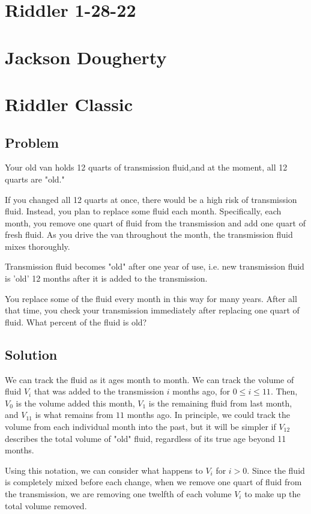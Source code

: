 \documentclass[reqno]{amsart}
\begin{document}
\section*{Riddler 1-28-22}
\section*{Jackson Dougherty}

\section{Riddler Classic}

\subsection*{Problem}

Your old van holds 12 quarts of transmission fluid,and at the moment, all 12 quarts are "old." 

If you changed all 12 quarts at once, there would be a high risk of transmission fluid. Instead, you plan to replace some fluid each month. Specifically, each month, you remove one quart of fluid from the transmission and add one quart of fresh fluid. As you drive the van throughout the month, the transmission fluid mixes thoroughly. 

Transmission fluid becomes "old" after one year of use, i.e. new transmission  fluid is 'old' 12 months after it is added to the transmission. 

You replace some of the fluid every month in this way for many years. After all that time, you check your transmission immediately after replacing one quart of fluid. What percent of the fluid is old?

\subsection*{Solution}

We can track the fluid as it ages month to month. We can track the volume of fluid $V_i$ that was added to the transmission $i$ months ago, for $0\leq i\leq 11$. Then, $V_0$ is the volume added this month, $V_1$ is the remaining fluid from last month, and $V_{11}$ is what remains from $11$ months ago. In principle, we could track the volume from each individual month into the past, but it will be simpler if $V_{12}$ describes the total volume of "old" fluid, regardless of its true age beyond 11 months. 

Using this notation, we can consider what happens to $V_i$ for $i>0$. Since the fluid is completely mixed before each change, when we remove one quart of fluid from the transmission, we are removing one twelfth of each volume $V_i$ to make up the total volume removed. 
\end{document}
